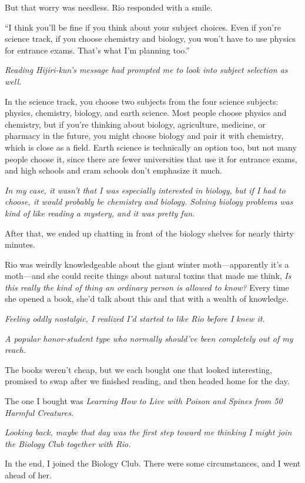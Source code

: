 \documentclass[
    a4paper,
    12pt,
    twoside,
    openany,
    UTF8,
    fontset=windows
]{ctexbook}
\begin{document}
But that worry was needless. Rio responded with a smile.

``I think you'll be fine if you think about your subject choices. Even if you're science track, if you choose chemistry and biology, you won't have to use physics for entrance exams. That's what I'm planning too.''

\textit{Reading Hijiri-kun's message had prompted me to look into subject selection as well.}

In the science track, you choose two subjects from the four science subjects: physics, chemistry, biology, and earth science. Most people choose physics and chemistry, but if you're thinking about biology, agriculture, medicine, or pharmacy in the future, you might choose biology and pair it with chemistry, which is close as a field. Earth science is technically an option too, but not many people choose it, since there are fewer universities that use it for entrance exams, and high schools and cram schools don't emphasize it much.

\textit{In my case, it wasn't that I was especially interested in biology, but if I had to choose, it would probably be chemistry and biology. Solving biology problems was kind of like reading a mystery, and it was pretty fun.}

After that, we ended up chatting in front of the biology shelves for nearly thirty minutes.

Rio was weirdly knowledgeable about the giant winter moth---apparently it's a moth---and she could recite things about natural toxins that made me think, \textit{Is this really the kind of thing an ordinary person is allowed to know?} Every time she opened a book, she'd talk about this and that with a wealth of knowledge.

\textit{Feeling oddly nostalgic, I realized I'd started to like Rio before I knew it.}

\textit{A popular honor-student type who normally should've been completely out of my reach.}

The books weren't cheap, but we each bought one that looked interesting, promised to swap after we finished reading, and then headed home for the day.

The one I bought was \textit{Learning How to Live with Poison and Spines from 50 Harmful Creatures.}

\textit{Looking back, maybe that day was the first step toward me thinking I might join the Biology Club together with Rio.}

In the end, I joined the Biology Club. There were some circumstances, and I went ahead of her.
\end{document}
